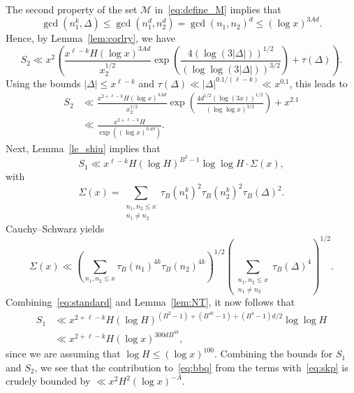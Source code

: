 \documentclass[11pt,letterpaper]{amsart}
\renewcommand{\leq}{\leqslant}
\theoremstyle{definition}
\numberwithin{equation}{section}
\DeclareMathOperator{\n}{N}
\newcommand{\0}{\mathbf{0}}
\begin{document}
The second property of the set $\mathcal M$ in~\eqref{eq:define_M} implies that 
\begin{equation}\label{eq:snow}
    \gcd(n_1^k,\Delta)\leq \gcd(n_1^d,n_2^d)=\gcd(n_1,n_2)^d\leq (\log x)^{3Ad}.
\end{equation}
Hence, by Lemma~\ref{lem:corlry}, we have 
$$ 
S_2\ll 
x^2\left(\frac{x^{\ell-k } H (\log x)^{3Ad 
}}{x_2^{1/2}}
 \exp\left(\frac{4  (   \log(3|\Delta|))^{1/2}  }{ (  \log \log(3|\Delta|) )^{3/2} } \right)
+ \tau(\Delta)\right) 
 .$$ 
Using the bounds   $|\Delta| \leq x^{\ell-k}$
and $\tau(\Delta) \ll |\Delta|^{0.1/(\ell-k)} \ll x^{0.1}$, this  leads to 
\begin{align*}
S_2&\ll
\frac{x^{2+\ell-k } H (\log x ) ^{3Ad
 } }{x_2^{1/2}}
 \exp\left(\frac{   4d^{1/2}(   \log(3x))^{1/2}  }{    (\log \log x)^{3/2} } \right)
+ x^{2.1}\\  &\ll  \frac{x^{ 2+\ell -k }H }{ \exp((\log x)^{0.49})}.
\end{align*}Next, Lemma~\ref{le_shiu} 
implies that 
$$ 
S_1
\ll 
x^{\ell-k } H 
(\log H)^{B^2-1}\log\log H \cdot 
\Sigma(x),
$$ 
with 
$$\Sigma(x)=   
\sum_{\substack{n_1,n_2\leq x\\n_1\neq n_2}}
\tau_B(n_1^k)^2
\tau_{B}(n_2^k)^2
\tau_B(\Delta)^2.$$   
Cauchy--Schwarz yields
$$\Sigma(x)
\ll \left(\sum_{n_1,n_2\leq x}
\tau_B(n_1)^{4k}
\tau_{B}(n_2)^{4k}\right)^{1/2}
\left(\sum_{\substack{n_1,n_2\leq x\\n_1\neq n_2}}
\tau_B(\Delta)^4\right)^{1/2}.
$$ 
Combining~\eqref{eq:standard} and  Lemma~\ref{lem:NT}, it now follows that 
\begin{align*}
S_1
&\ll 
x^{2+\ell-k}H(\log H)^{(B^2-1)+(B^{4k}-1)+(B^4-1)d/2}\log\log H   \\
&\ll 
x^{2+\ell-k}H(\log x)^{300dB^{4k}},
\end{align*}
since we are assuming that $\log H\leq (\log x)^{100}$.
Combining the bounds for $S_1$ and $S_2$, we see that the contribution to~\eqref{eq:bbq}
from the terms with~\eqref{eq:skp}  is crudely bounded by $\ll x^2H^2 (\log x)^{-A}$.
\end{document}
